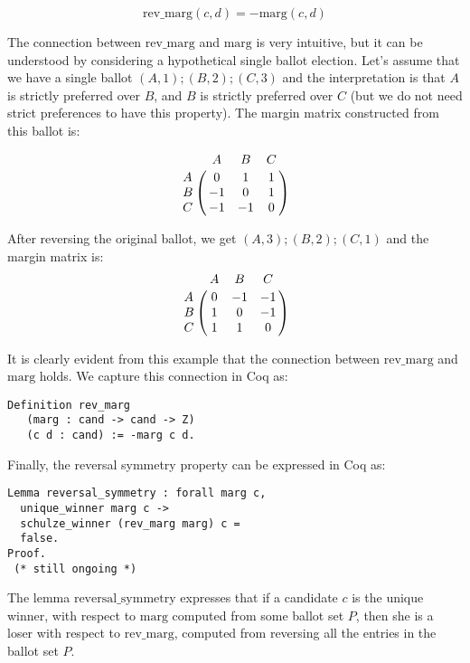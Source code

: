 \documentclass[compsoc,conference,a4paper,10pt,times]{IEEEtran}
\begin{document}
\[
  \mathrm{rev\_marg}(c, d) = -  \mathrm{marg} (c, d)  
\]      

\noindent
The connection between $\mathrm{rev\_marg}$ and $\mathrm{marg}$ is very intuitive, but it can be understood 
by considering a hypothetical single ballot election. Let's assume that we have 
a single ballot $(A, 1); (B, 2); (C, 3)$ and the interpretation is 
that $A$ is strictly preferred over $B$, and $B$ is strictly preferred over $C$ 
(but we do not need strict preferences to have this property).  The margin matrix
constructed from this ballot is: 

\[
\bordermatrix{ & A & B & C \cr
      A & 0 & 1 & 1 \cr
      B & -1 & 0 & 1 \cr
      C & -1 & -1 & 0 }
      \]
    
\noindent      
After reversing the original ballot, we get $(A, 3); (B, 2); (C, 1)$ and 
the margin matrix is:
\[
\bordermatrix{ & A & B & C \cr
      A & 0 & -1 & -1 \cr
      B & 1 & 0 & -1 \cr
      C & 1 & 1 & 0 }
      \]


\noindent
It is clearly evident from this example that the 
connection between $\mathrm{rev\_marg}$ and $\mathrm{marg}$  holds.
We capture this connection in Coq as:

\begin{verbatim}
Definition rev_marg 
   (marg : cand -> cand -> Z) 
   (c d : cand) := -marg c d.
\end{verbatim}

\noindent


Finally, the reversal symmetry property can be expressed in Coq as: 
\begin{verbatim}
Lemma reversal_symmetry : forall marg c, 
  unique_winner marg c ->
  schulze_winner (rev_marg marg) c = 
  false.
Proof. 
 (* still ongoing *)
\end{verbatim}

\noindent
The lemma $\mathrm{reversal\_symmetry}$ expresses that if a candidate $c$ is the unique 
winner, with respect to $\mathrm{marg}$ computed from some ballot set $P$, then she is 
a loser with respect to $\mathrm{rev\_marg}$, computed from reversing all the entries 
in the ballot set $P$.
\end{document}
